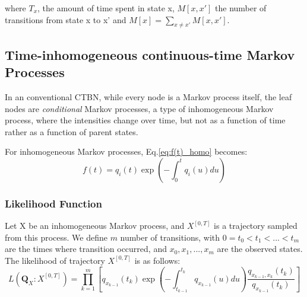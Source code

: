 where $ T_{x} $, the amount of time spent in state x, $ M[x,x'] $ the number of transitions from state x to x' and  $ M[x] = \sum_{x\neq x'}M[x,x'] $.\\

%

\subsection{Time-inhomogeneous continuous-time Markov Processes}
In an conventional CTBN, while every node is a Markov process itself, the leaf nodes are \textit{conditional} Markov processes, a type of inhomogeneous Markov process, where the intensities change over time, but not as a function of time rather as a function of parent states. \cite{Nodelman1995} %
 
For inhomogeneous Markov processes, Eq.\ref{eq:f(t)_homo} becomes:
\begin{equation}
f(t) = q_{i}(t) \exp \left(-\int_{0}^{t} q_{i}(u) d u\right)
\end{equation}
\subsubsection{Likelihood Function}
Let X be an inhomogeneous Markov process, and $  X^{\left[0,T\right] } $ is a trajectory sampled from this process. We define $ m $ number of transitions, with $ 0 = t_{0} < t_{1} < ... < t_{m} $ are the times where transition occurred, and $ x_{0}, x_{1},..., x_{m} $ are the observed states. The likelihood of trajectory  $  X^{\left[0,T\right] } $ is  as follows: 
\begin{equation}
L(\textbf{Q}_{X} \colon  X^{\left[0,T\right]} ) = \prod_{k=1}^{m} \left[ q_{x_{k-1}} (t_{k}) \exp \left(-\int_{t_{k-1}}^{t_{k}} q_{x_{k-1}}(u) d u\right) \frac{q_{x_{k-1}, x_{k}} (t_{k})}{q_{x_{k-1}}(t_{k})}\right] 
\label{eq:lh_traj_inhomo}
\end{equation}

